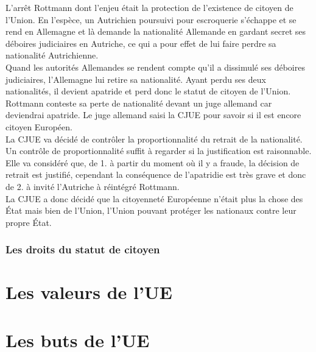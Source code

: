 \documentclass[12pt, a4paper, openany]{book}
\begin{document}
L'arrêt Rottmann dont l'enjeu était la protection de l'existence de citoyen de l'Union. En l'espèce, un Autrichien poursuivi pour escroquerie s'échappe et se rend en Allemagne et là demande la nationalité Allemande en gardant secret ses déboires judiciaires en Autriche, ce qui a pour effet de lui faire perdre sa nationalité Autrichienne. \\
Quand les autorités Allemandes se rendent compte qu'il a dissimulé ses déboires judiciaires, l'Allemagne lui retire sa nationalité. Ayant perdu ses deux nationalités, il devient apatride et perd donc le statut de citoyen de l'Union. Rottmann conteste sa perte de nationalité devant un juge allemand car deviendrai apatride. Le juge allemand saisi la CJUE pour savoir si il est encore citoyen Européen. \\
La CJUE va décidé de contrôler la proportionnalité du retrait de la nationalité. Un contrôle de proportionnalité suffit à regarder si la justification est raisonnable. Elle va considéré que, de 1. à partir du moment où il y a fraude, la décision de retrait est justifié, cependant la conséquence de l'apatridie est très grave et donc de 2. à invité l'Autriche à réintégré Rottmann. \\
La CJUE a donc décidé que la citoyenneté Européenne n'était plus la chose des État mais bien de l'Union, l'Union pouvant protéger les nationaux contre leur propre État. 




\subsection{Les droits du statut de citoyen}




\chapter{Les valeurs de l'UE}








\chapter{Les buts de l'UE}
\end{document}
